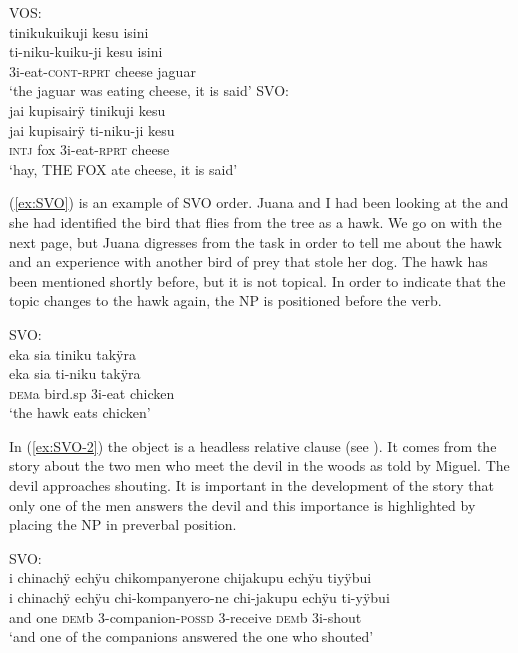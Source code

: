 \ea\label{ex:VOS-SVO}
  \ea\label{ex:VOS-SVO.1}
 \begingl 
\glpreamble  \textup{VOS:}\\tinikukuikuji kesu isini\\
\gla ti-niku-kuiku-ji kesu isini\\ 
\glb 3i-eat-\textsc{cont}-\textsc{rprt} cheese jaguar\\ 
\glft ‘the jaguar was eating cheese, it is said’
  \ex\label{ex:VOS-SVO.2}
 \begingl
\glpreamble   \textup{SVO:}\\jai kupisairÿ tinikuji kesu\\
\gla  jai kupisairÿ ti-niku-ji kesu\\
\glb \textsc{intj} fox 3i-eat-\textsc{rprt} cheese\\
\glft ‘hay, THE FOX ate cheese, it is said’
\endgl
\trailingcitation{[rxx-n120511l-1.026-027]}
\z
\xe

(\ref{ex:SVO}) is an example of SVO order. Juana and I had been looking at the  and she had identified the bird that flies from the tree as a hawk. We go on with the next page, but Juana digresses from the task in order to tell me about the hawk and an experience with another bird of prey that stole her dog. The hawk has been mentioned shortly before, but it is not topical. In order to indicate that the topic changes to the hawk again, the NP is positioned before the verb.

\ea\label{ex:SVO}
\begingl 
\glpreamble  \textup{SVO:}\\eka sia tiniku takÿra\\
\gla eka sia ti-niku takÿra\\ 
\glb \textsc{dem}a bird.sp 3i-eat chicken\\ 
\glft ‘the hawk eats chicken’
\trailingcitation{[jxx-a120516l-a.164]}
\xe

In (\ref{ex:SVO-2}) the object is a headless relative clause (see ). It comes from the story about the two men who meet the devil in the woods as told by Miguel. The devil approaches shouting. It is important in the development of the story that only one of the men answers the devil and this importance is highlighted by placing the NP in preverbal position.

\ea\label{ex:SVO-2}
\begingl
\glpreamble  \textup{SVO:}\\i chinachÿ echÿu chikompanyerone chijakupu echÿu tiyÿbui\\
\gla i chinachÿ echÿu chi-kompanyero-ne chi-jakupu echÿu ti-yÿbui\\
\glb and one \textsc{dem}b 3-companion-\textsc{possd} 3-receive \textsc{dem}b 3i-shout\\
\glft ‘and one of the companions answered the one who shouted’
\endgl
\trailingcitation{[mxx-n101017s-1.021]}
\xe

